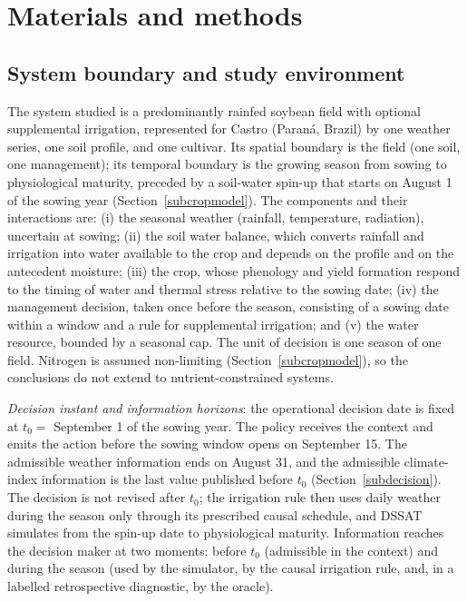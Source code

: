 \documentclass[times,final,authoryear]{elsarticle}
\begin{document}
\section{Materials and methods}
\label{metodologia}

\subsection{System boundary and study environment}
\label{subsystem}

The system studied is a predominantly rainfed soybean field with optional supplemental irrigation, represented for Castro (Paraná, Brazil) by one weather series, one soil profile, and one cultivar. Its spatial boundary is the field (one soil, one management); its temporal boundary is the growing season from sowing to physiological maturity, preceded by a soil-water spin-up that starts on August 1 of the sowing year (Section~\ref{subcropmodel}). The components and their interactions are: (i) the seasonal weather (rainfall, temperature, radiation), uncertain at sowing; (ii) the soil water balance, which converts rainfall and irrigation into water available to the crop and depends on the profile and on the antecedent moisture; (iii) the crop, whose phenology and yield formation respond to the timing of water and thermal stress relative to the sowing date; (iv) the management decision, taken once before the season, consisting of a sowing date within a window and a rule for supplemental irrigation; and (v) the water resource, bounded by a seasonal cap. The unit of decision is one season of one field. Nitrogen is assumed non-limiting (Section~\ref{subcropmodel}), so the conclusions do not extend to nutrient-constrained systems.

\emph{Decision instant and information horizons}: the operational decision date is fixed at $t_0=$ September 1 of the sowing year. The policy receives the context and emits the action before the sowing window opens on September 15. The admissible weather information ends on August 31, and the admissible climate-index information is the last value published before $t_0$ (Section~\ref{subdecision}). The decision is not revised after $t_0$; the irrigation rule then uses daily weather during the season only through its prescribed causal schedule, and DSSAT simulates from the spin-up date to physiological maturity. Information reaches the decision maker at two moments: before $t_0$ (admissible in the context) and during the season (used by the simulator, by the causal irrigation rule, and, in a labelled retrospective diagnostic, by the oracle).
\end{document}
